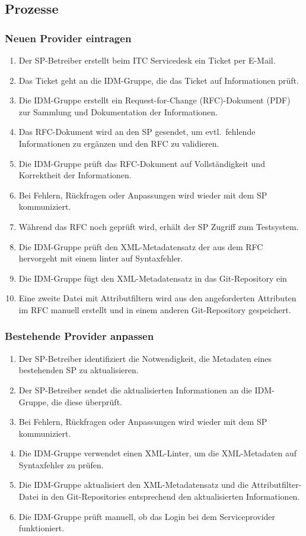 \documentclass[a4paper, fontsize=11pt]{scrartcl}
\begin{document}
\subsection{Prozesse}

\subsubsection{Neuen Provider eintragen}

\begin{enumerate}
  \item Der SP-Betreiber erstellt beim ITC Servicedesk ein Ticket per E-Mail.
  \item Das Ticket geht an die IDM-Gruppe, die das Ticket auf Informationen prüft.
  \item Die IDM-Gruppe erstellt ein Request-for-Change (RFC)-Dokument (PDF) zur Sammlung und Dokumentation der Informationen.
  \item Das RFC-Dokument wird an den SP gesendet, um evtl.\ fehlende Informationen zu ergänzen und den RFC zu validieren.
  \item Die IDM-Gruppe prüft das RFC-Dokument auf Vollständigkeit und Korrektheit der Informationen.
  \item Bei Fehlern, Rückfragen oder Anpassungen wird wieder mit dem SP kommuniziert.
  \item Während das RFC noch geprüft wird, erhält der SP Zugriff zum Testsystem.
  \item Die IDM-Gruppe prüft den XML-Metadatensatz der aus dem RFC hervorgeht mit einem linter auf Syntaxfehler.
  \item Die IDM-Gruppe fügt den XML-Metadatensatz in das Git-Repository ein
  \item Eine zweite Datei mit Attributfiltern wird aus den angeforderten Attributen im RFC manuell erstellt und in einem anderen Git-Repository gespeichert.
\end{enumerate}

\subsubsection{Bestehende Provider anpassen}

\begin{enumerate}
  \item Der SP-Betreiber identifiziert die Notwendigkeit, die Metadaten eines bestehenden SP zu aktualisieren.
  \item Der SP-Betreiber sendet die aktualisierten Informationen an die IDM-Gruppe, die diese überprüft.
  \item Bei Fehlern, Rückfragen oder Anpassungen wird wieder mit dem SP kommuniziert.
  \item Die IDM-Gruppe verwendet einen XML-Linter, um die XML-Metadaten auf Syntaxfehler zu prüfen.
  \item Die IDM-Gruppe aktualisiert den XML-Metadatensatz und die Attributfilter-Datei in den Git-Repositories entsprechend den aktualisierten Informationen.
  \item Die IDM-Gruppe prüft manuell, ob das Login bei dem Serviceprovider funktioniert.
\end{enumerate}
\end{document}

